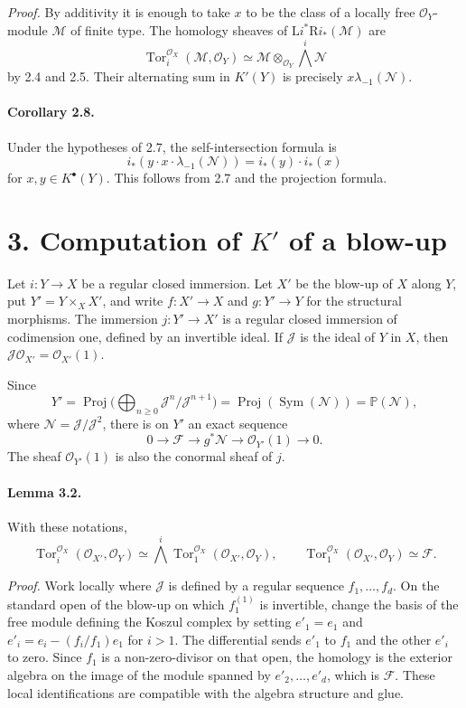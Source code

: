 \documentclass[12pt]{article}
\newcommand{\cO}{\mathcal O}
\newcommand{\cJ}{\mathcal J}
\newcommand{\cM}{\mathcal M}
\newcommand{\uF}{\mathcal F}
\newcommand{\uN}{\mathcal N}
\newcommand{\Kdot}{K^{\bullet}}
\newcommand{\Tor}{\operatorname{Tor}}
\newcommand{\Proj}{\operatorname{Proj}}
\newcommand{\Sym}{\operatorname{Sym}}
\newcommand{\RR}{\mathrm R}
\newcommand{\LL}{\mathrm L}
\newcommand{\bbP}{\mathbb P}
\begin{document}
\emph{Proof.} By additivity it is enough to take $x$ to be the class of a locally free $\cO_Y$-module $\cM$ of finite type. The homology sheaves of $\LL i^*\RR i_*(\cM)$ are
\[
\Tor_i^{\cO_X}(\cM,\cO_Y)\simeq \cM\otimes_{\cO_Y}\bigwedge^i\uN
\]
by 2.4 and 2.5. Their alternating sum in $K'(Y)$ is precisely $x\lambda_{-1}(\uN)$.

\paragraph{Corollary 2.8.} Under the hypotheses of 2.7, the self-intersection formula is
\[
i_*(y\cdot x\cdot\lambda_{-1}(\uN))=i_*(y)\cdot i_*(x)
\]
for $x,y\in\Kdot(Y)$. This follows from 2.7 and the projection formula.

\section*{3. Computation of $K'$ of a blow-up}

Let $i:Y\to X$ be a regular closed immersion. Let $X'$ be the blow-up of $X$ along $Y$, put $Y'=Y\times_XX'$, and write $f:X'\to X$ and $g:Y'\to Y$ for the structural morphisms. The immersion $j:Y'\to X'$ is a regular closed immersion of codimension one, defined by an invertible ideal. If $\cJ$ is the ideal of $Y$ in $X$, then $\cJ\cO_{X'}=\cO_{X'}(1)$.

Since
\[
Y'=\Proj\bigl(\bigoplus_{n\geq0}\cJ^n/\cJ^{n+1}\bigr)
=\Proj(\Sym(\uN))=\bbP(\uN),
\]
where $\uN=\cJ/\cJ^2$, there is on $Y'$ an exact sequence
\[
0\to\uF\to g^*\uN\to\cO_{Y'}(1)\to0.
\]
The sheaf $\cO_{Y'}(1)$ is also the conormal sheaf of $j$.

\paragraph{Lemma 3.2.} With these notations,
\[
\Tor_i^{\cO_X}(\cO_{X'},\cO_Y)\simeq \bigwedge^i\Tor_1^{\cO_X}(\cO_{X'},\cO_Y),
\qquad
\Tor_1^{\cO_X}(\cO_{X'},\cO_Y)\simeq \uF.
\]

\emph{Proof.} Work locally where $\cJ$ is defined by a regular sequence $f_1,\ldots,f_d$. On the standard open of the blow-up on which $f_1^{(1)}$ is invertible, change the basis of the free module defining the Koszul complex by setting $e'_1=e_1$ and $e'_i=e_i-(f_i/f_1)e_1$ for $i>1$. The differential sends $e'_1$ to $f_1$ and the other $e'_i$ to zero. Since $f_1$ is a non-zero-divisor on that open, the homology is the exterior algebra on the image of the module spanned by $e'_2,\ldots,e'_d$, which is $\uF$. These local identifications are compatible with the algebra structure and glue.
\end{document}
